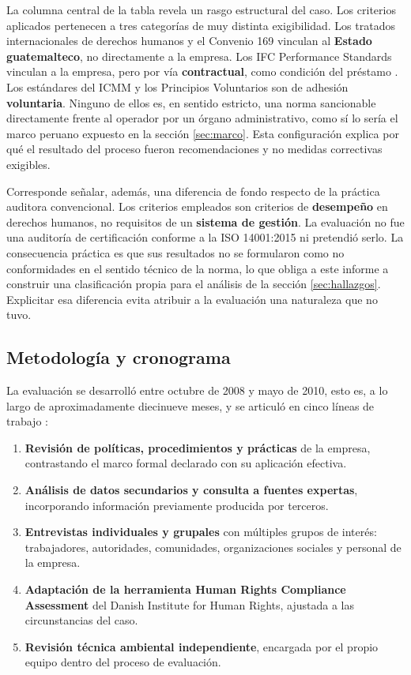 La columna central de la tabla revela un rasgo estructural del caso. Los criterios
aplicados pertenecen a tres categorías de muy distinta exigibilidad. Los tratados
internacionales de derechos humanos y el Convenio 169 vinculan al \textbf{Estado
guatemalteco}, no directamente a la empresa. Los IFC Performance Standards
vinculan a la empresa, pero por vía \textbf{contractual}, como condición del
préstamo \parencite{ifcsfmarlin}. Los estándares del ICMM y los Principios
Voluntarios son de adhesión \textbf{voluntaria}. Ninguno de ellos es, en sentido
estricto, una norma sancionable directamente frente al operador por un órgano
administrativo, como sí lo sería el marco peruano expuesto en la sección
\ref{sec:marco}. Esta configuración explica por qué el resultado del proceso
fueron recomendaciones y no medidas correctivas exigibles.

Corresponde señalar, además, una diferencia de fondo respecto de la práctica
auditora convencional. Los criterios empleados son criterios de
\textbf{desempeño} en derechos humanos, no requisitos de un \textbf{sistema de
gestión}. La evaluación no fue una auditoría de certificación conforme a la
ISO 14001:2015 ni pretendió serlo. La consecuencia práctica es que sus resultados
no se formularon como no conformidades en el sentido técnico de la norma, lo que
obliga a este informe a construir una clasificación propia para el análisis de la
sección \ref{sec:hallazgos}. Explicitar esa diferencia evita atribuir a la
evaluación una naturaleza que no tuvo.

\subsection{Metodología y cronograma}

La evaluación se desarrolló entre octubre de 2008 y mayo de 2010, esto es, a lo
largo de aproximadamente diecinueve meses, y se articuló en cinco líneas de
trabajo \parencite{oncommonground2010hria}:

\begin{enumerate}
  \item \textbf{Revisión de políticas, procedimientos y prácticas} de la empresa,
        contrastando el marco formal declarado con su aplicación efectiva.
  \item \textbf{Análisis de datos secundarios y consulta a fuentes expertas},
        incorporando información previamente producida por terceros.
  \item \textbf{Entrevistas individuales y grupales} con múltiples grupos de
        interés: trabajadores, autoridades, comunidades, organizaciones sociales y
        personal de la empresa.
  \item \textbf{Adaptación de la herramienta Human Rights Compliance Assessment}
        del Danish Institute for Human Rights, ajustada a las circunstancias del
        caso.
  \item \textbf{Revisión técnica ambiental independiente}, encargada por el propio
        equipo dentro del proceso de evaluación.
\end{enumerate}

